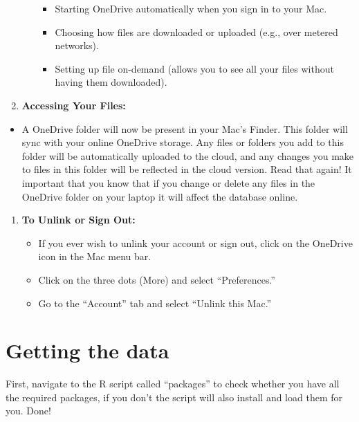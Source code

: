 \documentclass[
]{book}
\providecommand{\tightlist}{%
  \setlength{\itemsep}{0pt}\setlength{\parskip}{0pt}}
\begin{document}
\begin{enumerate}
\begin{itemize}
    \begin{itemize}
    \tightlist
    \item
      Starting OneDrive automatically when you sign in to your Mac.
    \item
      Choosing how files are downloaded or uploaded (e.g., over metered networks).
    \item
      Setting up file on-demand (allows you to see all your files without having them downloaded).
    \end{itemize}
  \end{itemize}
\item
  \textbf{Accessing Your Files:}
\end{enumerate}

\begin{itemize}
\tightlist
\item
  A OneDrive folder will now be present in your Mac's Finder. This folder will sync with your online OneDrive storage. { Any files or folders you add to this folder will be automatically uploaded to the cloud, and any changes you make to files in this folder will be reflected in the cloud version.} Read that again! It important that you know that if you change or delete any files in the OneDrive folder on your laptop it will affect the database online.
\end{itemize}

\begin{enumerate}
\def\labelenumi{\arabic{enumi}.}
\setcounter{enumi}{6}
\tightlist
\item
  \textbf{To Unlink or Sign Out:}

  \begin{itemize}
  \tightlist
  \item
    If you ever wish to unlink your account or sign out, click on the OneDrive icon in the Mac menu bar.
  \item
    Click on the three dots (More) and select ``Preferences.''
  \item
    Go to the ``Account'' tab and select ``Unlink this Mac.''
  \end{itemize}
\end{enumerate}

\hypertarget{getting-the-data}{%
\section{Getting the data}\label{getting-the-data}}

First, navigate to the R script called ``packages'' to check whether you have all the required packages, if you don't the script will also install and load them for you. Done!
\end{document}
